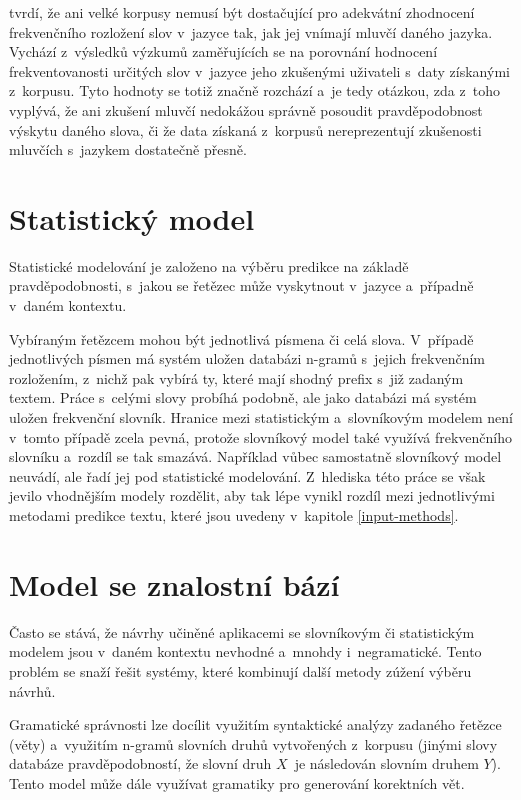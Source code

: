 \documentclass[a4paper,11pt,openany]{book} %
\begin{document}
\parencite{alderson2007judging} tvrdí, že ani velké korpusy nemusí být dostačující pro adekvátní zhodnocení frekvenčního rozložení slov v~jazyce tak, jak jej vnímají mluvčí daného jazyka. Vychází z~výsledků výzkumů zaměřujících se na porovnání hodnocení frekventovanosti určitých slov v~jazyce jeho zkušenými uživateli s~daty získanými z~korpusu. Tyto hodnoty se totiž značně rozchází a~je tedy otázkou, zda z~toho vyplývá, že ani zkušení mluvčí nedokážou správně posoudit pravděpodobnost výskytu daného slova, či že data získaná z~korpusů nereprezentují zkušenosti mluvčích s~jazykem dostatečně přesně.

\section{Statistický model}

Statistické modelování je založeno na výběru predikce na základě pravděpodobnosti, s~jakou se řetězec může vyskytnout v~jazyce a~případně v~daném kontextu. \parencite[5233]{ghayoomi2009overview}

Vybíraným řetězcem mohou být jednotlivá písmena či celá slova. V~případě jednotlivých písmen má systém uložen databázi n-gramů s~jejich frekvenčním rozložením, z~nichž pak vybírá ty, které mají shodný prefix s~již zadaným textem. Práce s~celými slovy probíhá podobně, ale jako databázi má systém uložen frekvenční slovník. Hranice mezi statistickým a~slovníkovým modelem není v~tomto případě zcela pevná, protože slovníkový model také využívá frekvenčního slovníku a~rozdíl se tak smazává. Například \parencite[5234]{ghayoomi2009overview} vůbec samostatně slovníkový model neuvádí, ale řadí jej pod statistické modelování. Z~hlediska této práce se však jevilo vhodnějším modely rozdělit, aby tak lépe vynikl rozdíl mezi jednotlivými metodami predikce textu, které jsou uvedeny v~kapitole \ref{input-methods}.

\section{Model se znalostní bází}

Často se stává, že návrhy učiněné aplikacemi se slovníkovým či statistickým modelem jsou v~daném kontextu nevhodné a~mnohdy i~negramatické. Tento problém se snaží řešit systémy, které kombinují další metody zúžení výběru návrhů. 

Gramatické správnosti lze docílit využitím syntaktické analýzy zadaného řetězce (věty) a~využitím n-gramů slovních druhů vytvořených z~korpusu (jinými slovy databáze pravděpodobností, že slovní druh $X$~je následován slovním druhem $Y$). Tento model může dále využívat gramatiky pro generování korektních vět. \parencite[5234--5235]{ghayoomi2009overview}
\end{document}
